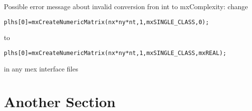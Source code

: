 \documentclass[12pt]{article}
\begin{document}
Possible error message about invalid conversion fron int to mxComplexity: change 

\begin{verbatim}
plhs[0]=mxCreateNumericMatrix(nx*ny*nt,1,mxSINGLE_CLASS,0);
\end{verbatim} 

to 

\begin{verbatim}
plhs[0]=mxCreateNumericMatrix(nx*ny*nt,1,mxSINGLE_CLASS,mxREAL);
\end{verbatim}

in any mex interface files

\section{Another Section}




\end{document}
